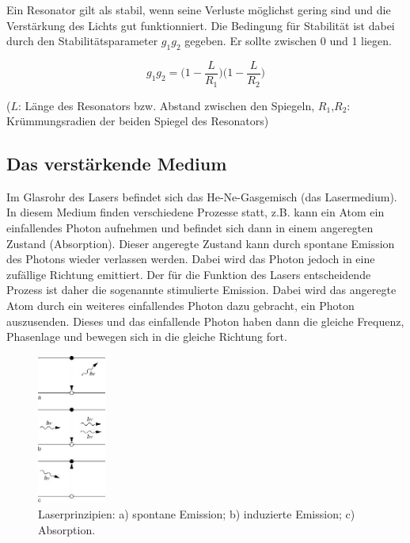 Ein Resonator gilt als stabil, wenn seine Verluste möglichst gering sind und die Verstärkung des Lichts gut funktionniert.
Die Bedingung für Stabilität ist dabei durch den Stabilitätsparameter $g_1g_2$ gegeben. Er sollte zwischen 0 und 1 liegen.

\begin{equation}
  g_1g_2 = \biggl(1-\frac{L}{R_1}\biggr)\biggl(1-\frac{L}{R_2}\biggr)
\end{equation}

($L$: Länge des Resonators bzw. Abstand zwischen den Spiegeln, $R_1$,$R_2$: Krümmungsradien der beiden Spiegel des Resonators)

\subsection{Das verstärkende Medium}

Im Glasrohr des Lasers befindet sich das He-Ne-Gasgemisch (das Lasermedium). In diesem Medium finden verschiedene Prozesse
statt, z.B. kann ein Atom ein einfallendes Photon aufnehmen und befindet sich dann in einem angeregten Zustand (Absorption).
Dieser angeregte Zustand kann durch spontane Emission des Photons wieder verlassen werden. Dabei wird das Photon jedoch
in eine zufällige Richtung emittiert. Der für die Funktion des Lasers entscheidende Prozess ist daher die sogenannte stimulierte
Emission. Dabei wird das angeregte Atom durch ein weiteres einfallendes Photon dazu gebracht, ein Photon auszusenden.
Dieses und das einfallende Photon haben dann die gleiche Frequenz, Phasenlage und bewegen sich in die gleiche Richtung fort.

\begin{figure}
\centering
\includegraphics[width=0.2\textwidth]{emission.jpg}
\caption{Laserprinzipien: a) spontane Emission; b) induzierte Emission; c) Absorption.\cite{spektrum}}
\label{fig:emission}
\end{figure}

